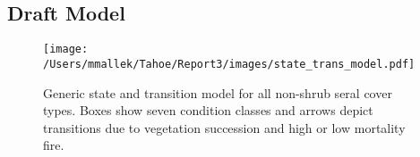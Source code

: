 \subsection{Draft Model}
\begin{figure}[htbp]
\centering
\texttt{[image: /Users/mmallek/Tahoe/Report3/images/state\_trans\_model.pdf]}
\caption{Generic state and transition model for all non-shrub seral cover types. Boxes show seven condition classes and arrows depict transitions due to vegetation succession and high or low mortality fire.} 
\label{cmm_transmodel}
\end{figure}




